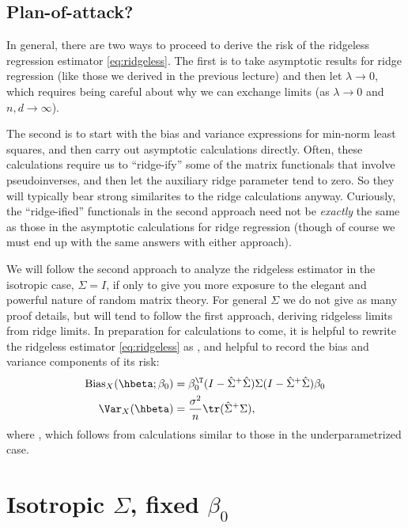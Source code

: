 \documentclass{article}
\begin{document}
\subsection{Plan-of-attack?}

In general, there are two ways to proceed to derive the risk of the ridgeless
regression estimator \eqref{eq:ridgeless}. The first is to take asymptotic
results for ridge regression (like those we derived in the previous lecture) and 
then let $\lambda \to 0$, which requires being careful about why we can exchange
limits (as $\lambda \to 0$ and $n,d \to \infty$).  

The second is to start with the bias and variance expressions for min-norm 
least squares, and then carry out asymptotic calculations directly. Often, these
calculations require us to ``ridge-ify'' some of the matrix functionals
that involve pseudoinverses, and then let the auxiliary ridge parameter tend to
zero. So they will typically bear strong similarites to the ridge calculations 
anyway. Curiously, the ``ridge-ified'' functionals in the second approach need
not be \emph{exactly} the same as those in the asymptotic calculations for ridge
regression (though of course we must end up with the same answers with either
approach).           

We will follow the second approach to analyze the ridgeless estimator in the
isotropic case, $\Sigma = I$, if only to give you more exposure to the elegant
and powerful nature of random matrix theory. For general $\Sigma$ we do not give
as many proof details, but will tend to follow the first approach, deriving
ridgeless limits from ridge limits. In preparation for calculations to come, it
is helpful to rewrite the ridgeless estimator  \eqref{eq:ridgeless} as
, and helpful to record the bias and
variance components of its risk:     
\begin{align}
\label{eq:ridgeless_bias}
\Bias_X(\hbeta; \beta_0) &= \beta_0^\T (I - \hSigma^+ \hSigma) \Sigma 
  (I - \hSigma^+ \hSigma) \beta_0 \\  
\label{eq:ridgeless_var}
\Var_X(\hbeta) &= \frac{\sigma^2}{n} \tr (\hSigma^+ \Sigma),
\end{align}
where , which follows from calculations similar to
those in the underparametrized case.      

\section{Isotropic $\Sigma$, fixed $\beta_0$}
\end{document}

